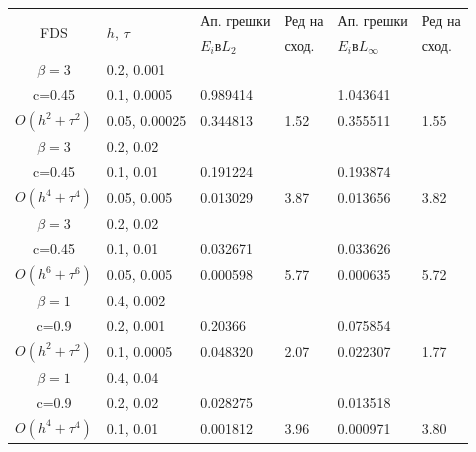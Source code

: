 \documentclass{article}
\begin{document}
\begin{table}[ht]
\centering
\small
		\begin{tabular}{||c|l|ll|ll||}
			\hline
			\hline

      \multirow{2  }{*}{FDS}        & \multirow{2  }{*}{$h$, $\tau$}  & Ап. грешки      &Ред на& Ап. грешки        &Ред на   \\
	                                        &                                                     &  $E_i$в$L_2$ &  сход. & $E_i$в$L_\infty$  & сход. \\
   			\hline 
					\hline 
  $\beta=3$                &0.2, 0.001          &              &              &                     &      \\
   c=0.45                     &0.1, 0.0005          &0.989414 &            &1.043641    &       \\
     $O(h^2 + \tau^ 2)$ &0.05, 0.00025   & 0.344813 & 1.52    &0.355511    &  1.55      \\
			\hline 
  $\beta=3$               &0.2, 0.02       &              &            &                     &      \\
   c=0.45                    &0.1, 0.01      &0.191224 &            &0.193874    &       \\
     $O(h^4+ \tau^4)$ &0.05, 0.005&0.013029 & 3.87   &0.013656     &3.82       \\
			\hline 
  $\beta=3$               &0.2, 0.02       &                &            &                     &      \\
     c=0.45                 &0.1, 0.01        &0.032671 &            &  0.033626    &       \\
     $O(h^6+ \tau^6)$ &0.05, 0.005 &0.000598 &5.77     & 0.000635    & 5.72       \\
	   \hline
			\hline 
       $\beta=1$       &0.4, 0.002        &             &            &           &   \\
                  c=0.9    &0.2, 0.001       &  0.20366   &            &0.075854 &   \\
  $O(h^2+ \tau^2)$ &0.1, 0.0005   &0.048320   &2.07  &0.022307  & 1.77 \\
			\hline
      $\beta=1$               &0.4, 0.04    &            &               &             &    \\
       c=0.9                     &0.2, 0.02     & 0.028275   &        &  0.013518   &   \\
       $O(h^4+ \tau^4)$ &0.1, 0.01   &0.001812 & 3.96  & 0.000971  & 3.80  \\

\end{tabular}
\end{table}
\end{document}
